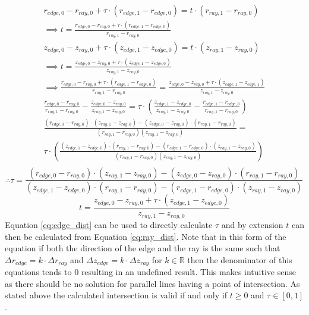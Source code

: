 \documentclass{article}
\begin{document}
\begin{align*}
  r_{edge, 0} - r_{ray, 0} + \tau\cdot(r_{edge, 1} - r_{edge, 0}) = t\cdot (r_{ray, 1} - r_{ray, 0})\\
  \implies t = \frac{ r_{edge, 0} - r_{ray, 0} + \tau\cdot(r_{edge, 1} - r_{edge, 0})}{r_{ray, 1} - r_{ray, 0}} \\
  z_{edge, 0} - z_{ray, 0} + \tau\cdot(z_{edge, 1} - z_{edge, 0}) = t\cdot (z_{ray, 1} - z_{ray, 0})\\
  \implies t = \frac{ z_{edge, 0} - z_{ray, 0} + \tau\cdot(z_{edge, 1} - z_{edge, 0})}{z_{ray, 1} - z_{ray, 0}} \\
  \implies  \frac{ r_{edge, 0} - r_{ray, 0} + \tau\cdot(r_{edge, 1} - r_{edge, 0})}{r_{ray, 1} - r_{ray, 0}} = \frac{ z_{edge, 0} - z_{ray, 0} + \tau\cdot(z_{edge, 1} - z_{edge, 1})}{z_{ray, 1} - z_{ray, 0}} \\ 
  \frac{r_{edge, 0} - r_{ray, 0}}{r_{ray, 1} - r_{ray, 0}} - \frac{z_{edge, 0} - z_{ray, 0}}{z_{ray, 1} -z_{ray, 0}} = \tau\cdot\left(\frac{z_{edge, 1} - z_{edge, 0}}{z_{ray, 1} - z_{ray, 0}} - \frac{r_{edge, 1} - r_{edge, 0}}{r_{ray, 1} - r_{ray, 0}}\right)\\
\frac{(r_{edge, 0} - r_{ray, 0})\cdot(z_{ray, 1} - z_{ray, 0}) - (z_{edge, 0} - z_{ray, 0})\cdot(r_{ray, 1} - r_{ray, 0})}{(r_{ray, 1} - r_{ray, 0})(z_{ray, 1} - z_{ray, 0})} = \\ \tau\cdot\left(\frac{(z_{edge, 1} - z_{edge, 0})\cdot(r_{ray, 1} - r_{ray, 0}) - (r_{edge, 1} - r_{edge, 0})\cdot(z_{ray, 1} - z_{ray, 0})}{(r_{ray, 1} - r_{ray, 0})(z_{ray, 1} - z_{ray, 0})}\right) \\
\end{align*}
\begin{equation}
  \label{eq:edge_dist}
\therefore \tau = \frac{(r_{edge, 0} - r_{ray, 0})\cdot(z_{ray, 1} - z_{ray, 0}) - (z_{edge, 0} - z_{ray, 0})\cdot(r_{ray, 1} - r_{ray, 0})}{(z_{edge, 1} - z_{edge, 0})\cdot(r_{ray, 1} - r_{ray, 0}) - (r_{edge, 1} - r_{edge, 0})\cdot(z_{ray, 1} - z_{ray, 0})}
\end{equation}
\begin{equation}
  \label{eq:ray_dist}
  t = \frac{ z_{edge, 0} - z_{ray, 0} + \tau\cdot(z_{edge, 1} - z_{edge, 0})}{z_{ray, 1} - z_{ray, 0}}
\end{equation}
Equation \ref{eq:edge_dist} can be used to directly calculate $\tau$ and by extension $t$ can then be calculated from Equation \ref{eq:ray_dist}. Note that in this form of the equation if both the direction of the edge and the ray is the same such that $\Delta r_{edge} = k\cdot\Delta r_{ray}$ and $\Delta z_{edge} = k\cdot\Delta z_{ray}$ for $k\in\mathbb{R}$ then the denominator of this equations tends to $0$ resulting in an undefined result. This makes intuitive sense as there should be no solution for parallel lines having a point of intersection. As stated above the calculated intersection is valid if and only if $t\geq0$ and $\tau\in[0, 1]$. 
\end{document}
